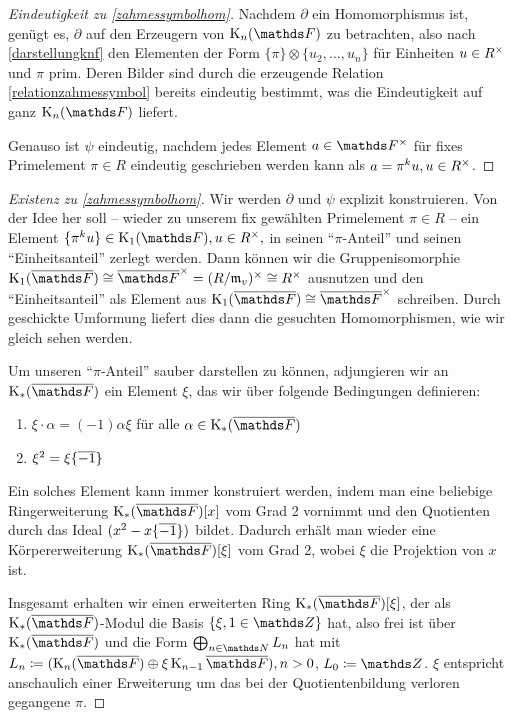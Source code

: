 \documentclass[ngerman,fontsize=11pt, paper=a4, parskip=half, titlepage=true, toc=bib]{scrartcl}
\begin{document}
\begin{proof}[Eindeutigkeit zu \ref{zahmessymbolhom}]
  Nachdem $\partial$ ein Homomorphismus ist, genügt es, $\partial$ auf
  den Erzeugern von $\KnF$ zu betrachten, also nach \ref{darstellungknf} den
  Elementen der Form $\{\pi\}\otimes\{u_{2},\dotsc,u_{n}\}$ für
  Einheiten $u\in R^\times$ und $\pi$ prim.
  Deren Bilder sind durch die erzeugende Relation 
  \ref{relationzahmessymbol} bereits eindeutig
  bestimmt, was die Eindeutigkeit auf ganz $\KnF$ liefert.
  
  Genauso ist $\psi$ eindeutig, nachdem jedes Element $a\in\Fx$ für
  fixes Primelement $\pi\in R$ eindeutig geschrieben werden kann als
  $a=\pi^k u, u\in R^\times$.
\end{proof}

\begin{proof}[Existenz zu \ref{zahmessymbolhom}]
  Wir werden $\partial$ und $\psi$ explizit konstruieren.
  Von der Idee her soll 
  – wieder zu unserem fix gewählten Primelement $\pi\in R$ – 
  ein Element $\{\pi^ku\}\in\KoF, u\in \Rx,$
  in seinen \enquote{$\pi$-Anteil} und seinen 
  \enquote{Einheitsanteil} zerlegt werden. 
  Dann können wir die Gruppenisomorphie
  $\K_1(\bF)\cong\bF^\times=(R/\frakm_v)^\times\cong \Rx$
  ausnutzen und den \enquote{Einheitsanteil} als Element aus 
  $\K_1(\bF)\cong \bF^\times$
  schreiben. Durch geschickte Umformung liefert dies dann die
  gesuchten Homomorphismen, wie wir gleich sehen werden.
  
  Um unseren \enquote{$\pi$-Anteil} sauber darstellen zu können,
  adjungieren wir an $\KbF$ ein Element $\xi$, das wir über
  folgende Bedingungen definieren:
  \begin{enumerate}[(1)]
  \item $\xi\cdot \alpha=(-1)\alpha\xi$ für alle $\alpha\in\KbF$
  \item $\xi^2=\xi\{\overline{-1}\}$
  \end{enumerate}
  Ein solches Element kann immer konstruiert werden, indem man eine
  beliebige Ringerweiterung $\KbF[x]$ vom Grad 2 vornimmt und den
  Quotienten durch das Ideal $(x^2-x\{\overline{-1}\})$ bildet. Dadurch
  erhält man wieder eine Körpererweiterung $\KbF[\xi]$ vom Grad 2,
  wobei $\xi$ die Projektion von $x$ ist.
  
  Insgesamt erhalten wir einen erweiterten Ring $\KbF[\xi]$, der als
  $\KbF$-Modul die Basis $\{ \xi, 1\in\Z\}$ hat, also frei ist über
  $\KbF$ und die Form $\bigoplus_{n\in\N}L_n$ hat
  mit $L_n\coloneqq (\KnbF\oplus\xi\K_{n-1}\bF), n>0$, $L_0\coloneqq\Z$.
  $\xi$ entspricht anschaulich einer Erweiterung um das bei
  der Quotientenbildung verloren gegangene $\pi$.


\end{proof}
\end{document}
